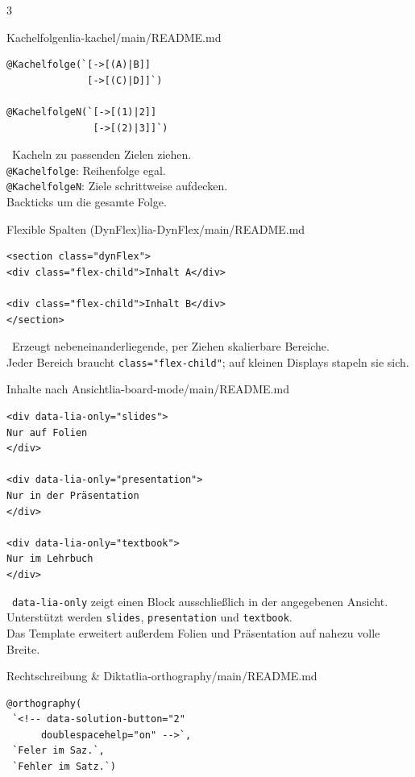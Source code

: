 \documentclass[a4paper,landscape,9pt]{extarticle}
\newcommand{\prevsm}[1]{{\footnotesize\color{muted} #1}}
\begin{document}
\begin{multicols}{3}
\begin{schulcard}{Kachelfolgen}{lia-kachel/main/README.md}
\begin{lstlisting}[language=lia]
@Kachelfolge(`[->[(A)|B]]
              [->[(C)|D]]`)

@KachelfolgeN(`[->[(1)|2]]
               [->[(2)|3]]`)
\end{lstlisting}
\tcblower
\prevsm{\faTh~Kacheln zu passenden Zielen ziehen.\\[2pt]
\texttt{@Kachelfolge}: Reihenfolge egal.\\
\texttt{@KachelfolgeN}: Ziele schrittweise aufdecken.\\[2pt]
{\footnotesize Backticks um die gesamte Folge.}}
\end{schulcard}

\begin{schulcard}{Flexible Spalten (DynFlex)}{lia-DynFlex/main/README.md}
\begin{lstlisting}[language=lia]
<section class="dynFlex">
<div class="flex-child">Inhalt A</div>

<div class="flex-child">Inhalt B</div>
</section>
\end{lstlisting}
\tcblower
\prevsm{\faColumns~Erzeugt nebeneinanderliegende, per Ziehen skalierbare Bereiche.\\[2pt]
Jeder Bereich braucht \texttt{class="flex-child"}; auf kleinen Displays stapeln sie sich.}
\end{schulcard}

\begin{schulcard}{Inhalte nach Ansicht}{lia-board-mode/main/README.md}
\begin{lstlisting}[language=lia]
<div data-lia-only="slides">
Nur auf Folien
</div>

<div data-lia-only="presentation">
Nur in der Präsentation
</div>

<div data-lia-only="textbook">
Nur im Lehrbuch
</div>
\end{lstlisting}
\tcblower
\prevsm{\faEye~\texttt{data-lia-only} zeigt einen Block ausschließlich in der angegebenen Ansicht.\\[2pt]
Unterstützt werden \texttt{slides}, \texttt{presentation} und \texttt{textbook}.\\[2pt]
{\footnotesize Das Template erweitert außerdem Folien und Präsentation auf nahezu volle Breite.}}
\end{schulcard}

\begin{schulcard}{Rechtschreibung \& Diktat}{lia-orthography/main/README.md}
\begin{lstlisting}[language=lia]
@orthography(
 `<!-- data-solution-button="2"
      doublespacehelp="on" -->`,
 `Feler im Saz.`,
 `Fehler im Satz.`)


\end{lstlisting}
\end{schulcard}
\end{multicols}
\end{document}
